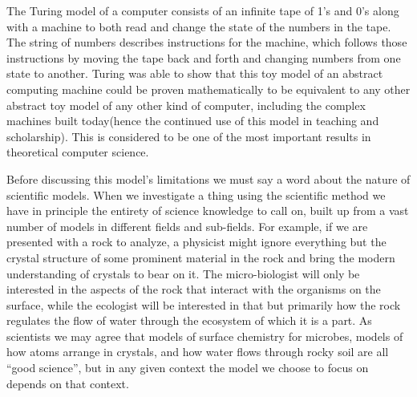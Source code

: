 The Turing model of a computer consists of an infinite tape of 1's and
0's along with a machine to both read and change the state of the
numbers in the tape. The string of numbers describes instructions for
the machine, which follows those instructions by moving the tape back
and forth and changing numbers from one state to another. Turing was
able to show that this toy model of an abstract computing machine could
be proven mathematically to be equivalent to any other abstract toy
model of any other kind of computer, including the complex machines
built today(hence the continued use of this model in teaching and
scholarship). This is considered to be one of the most important results
in theoretical computer science.

Before discussing this model's limitations we must say a word about the
nature of scientific models. When we investigate a thing using the
scientific method we have in principle the entirety of science knowledge
to call on, built up from a vast number of models in different fields
and sub-fields. For example, if we are presented with a rock to analyze,
a physicist might ignore everything but the crystal structure of some
prominent material in the rock and bring the modern understanding of
crystals to bear on it. The micro-biologist will only be interested in
the aspects of the rock that interact with the organisms on the surface,
while the ecologist will be interested in that but primarily how the
rock regulates the flow of water through the ecosystem of which it is a
part. As scientists we may agree that models of surface chemistry for
microbes, models of how atoms arrange in crystals, and how water flows
through rocky soil are all ``good science'', but in any given context
the model we choose to focus on depends on that context.

